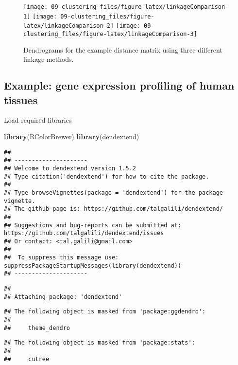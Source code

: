 \documentclass[]{book}
\newenvironment{Shaded}{\begin{snugshade}}{\end{snugshade}}
\newcommand{\KeywordTok}[1]{\textcolor[rgb]{0.13,0.29,0.53}{\textbf{{#1}}}}
\newcommand{\NormalTok}[1]{{#1}}
\theoremstyle{definition}
\theoremstyle{definition}
\theoremstyle{definition}
\theoremstyle{remark}
\begin{document}
\begin{figure}

{\centering \texttt{[image: 09-clustering\_files/figure-latex/linkageComparison-1]} \texttt{[image: 09-clustering\_files/figure-latex/linkageComparison-2]} \texttt{[image: 09-clustering\_files/figure-latex/linkageComparison-3]} 

}

\caption{Dendrograms for the example distance matrix using three different linkage methods. }\label{fig:linkageComparison}
\end{figure}

\subsection{Example: gene expression profiling of human
tissues}\label{example-gene-expression-profiling-of-human-tissues}

Load required libraries

\begin{Shaded}
\begin{Highlighting}[]
\KeywordTok{library}\NormalTok{(RColorBrewer)}
\KeywordTok{library}\NormalTok{(dendextend)}
\end{Highlighting}
\end{Shaded}

\begin{verbatim}
## 
## ---------------------
## Welcome to dendextend version 1.5.2
## Type citation('dendextend') for how to cite the package.
## 
## Type browseVignettes(package = 'dendextend') for the package vignette.
## The github page is: https://github.com/talgalili/dendextend/
## 
## Suggestions and bug-reports can be submitted at: https://github.com/talgalili/dendextend/issues
## Or contact: <tal.galili@gmail.com>
## 
##  To suppress this message use:  suppressPackageStartupMessages(library(dendextend))
## ---------------------
\end{verbatim}

\begin{verbatim}
## 
## Attaching package: 'dendextend'
\end{verbatim}

\begin{verbatim}
## The following object is masked from 'package:ggdendro':
## 
##     theme_dendro
\end{verbatim}

\begin{verbatim}
## The following object is masked from 'package:stats':
## 
##     cutree
\end{verbatim}
\end{document}
